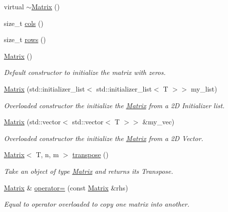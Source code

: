 \begin{DoxyCompactItemize}
\item 
virtual \hyperlink{classMATOPS_1_1Matrix_a9e67c9220ad942e35655ff62ad268365}{$\sim$\+Matrix} ()
\item 
size\+\_\+t \hyperlink{classMATOPS_1_1Matrix_a4fde0b19d8cd6ca18c24d836355a2e5a}{cols} ()
\item 
size\+\_\+t \hyperlink{classMATOPS_1_1Matrix_a3eb38202054437704ba4ceba78959d5b}{rows} ()
\item 
\hyperlink{classMATOPS_1_1Matrix_ab714719c18d79c8d0480d0665ff56609}{Matrix} ()
\begin{DoxyCompactList}\small\item\em Default constructor to initialize the matrix with zeros. \end{DoxyCompactList}\item 
\hyperlink{classMATOPS_1_1Matrix_ab665ea80cebcf2656c51dac5a86efd7b}{Matrix} (std\+::initializer\+\_\+list$<$ std\+::initializer\+\_\+list$<$ T $>$$>$ my\+\_\+list)
\begin{DoxyCompactList}\small\item\em Overloaded constructor the initialize the \hyperlink{classMATOPS_1_1Matrix}{Matrix} from a 2D Initializer list. \end{DoxyCompactList}\item 
\hyperlink{classMATOPS_1_1Matrix_a6daf4c8232f2e9b0b1297a6e08eb4f1c}{Matrix} (std\+::vector$<$ std\+::vector$<$ T $>$$>$ \&my\+\_\+vec)
\begin{DoxyCompactList}\small\item\em Overloaded constructor the initialize the \hyperlink{classMATOPS_1_1Matrix}{Matrix} from a 2D Vector. \end{DoxyCompactList}\item 
\hyperlink{classMATOPS_1_1Matrix}{Matrix}$<$ T, n, m $>$ \hyperlink{classMATOPS_1_1Matrix_aa278f18f2e1324c56d965cd5e033b4eb}{transpose} ()
\begin{DoxyCompactList}\small\item\em Take an object of type \hyperlink{classMATOPS_1_1Matrix}{Matrix} and returns its Transpose. \end{DoxyCompactList}\item 
\hyperlink{classMATOPS_1_1Matrix}{Matrix} \& \hyperlink{classMATOPS_1_1Matrix_a4512ee518878124f54e3c596d2847d86}{operator=} (const \hyperlink{classMATOPS_1_1Matrix}{Matrix} \&rhs)
\begin{DoxyCompactList}\small\item\em Equal to operator overloaded to copy one matrix into another. \end{DoxyCompactList}\item 

\end{DoxyCompactItemize}
